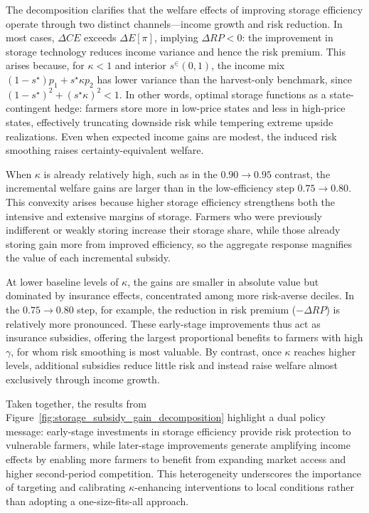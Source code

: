 The decomposition clarifies that the welfare effects of improving storage efficiency operate through two distinct channels---income growth and risk reduction. In most cases, $\Delta CE$ exceeds $\Delta E[\pi]$, implying $\Delta RP<0$: the improvement in storage technology reduces income variance and hence the risk premium. This arises because, for $\kappa<1$ and interior $s^\in(0,1)$, the income mix $(1-s^\star)p_1 + s^\star\kappa p_2$ has lower variance than the harvest-only benchmark, since $(1-s^\star)^2 + (s^\star\kappa)^2 < 1$. In other words, optimal storage functions as a state-contingent hedge: farmers store more in low-price states and less in high-price states, effectively truncating downside risk while tempering extreme upside realizations. Even when expected income gains are modest, the induced risk smoothing raises certainty-equivalent welfare.

When $\kappa$ is already relatively high, such as in the $0.90 \rightarrow 0.95$ contrast, the incremental welfare gains are larger than in the low-efficiency step $0.75 \rightarrow 0.80$. This convexity arises because higher storage efficiency strengthens both the intensive and extensive margins of storage. Farmers who were previously indifferent or weakly storing increase their storage share, while those already storing gain more from improved efficiency, so the aggregate response magnifies the value of each incremental subsidy.

At lower baseline levels of $\kappa$, the gains are smaller in absolute value but dominated by insurance effects, concentrated among more risk-averse deciles. In the $0.75 \rightarrow 0.80$ step, for example, the reduction in risk premium ($- \Delta RP$) is relatively more pronounced. These early-stage improvements thus act as insurance subsidies, offering the largest proportional benefits to farmers with high $\gamma$, for whom risk smoothing is most valuable. By contrast, once $\kappa$ reaches higher levels, additional subsidies reduce little risk and instead raise welfare almost exclusively through income growth. 

Taken together, the results from Figure~\ref{fig:storage_subsidy_gain_decomposition} highlight a dual policy message: early-stage investments in storage efficiency provide risk protection to vulnerable farmers, while later-stage improvements generate amplifying income effects by enabling more farmers to benefit from expanding market access and higher second-period competition. This heterogeneity underscores the importance of targeting and calibrating $\kappa$-enhancing interventions to local conditions rather than adopting a one-size-fits-all approach. 





